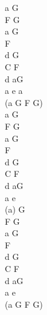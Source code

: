 \documentclass[a5paper, 10pt]{book}
\begin{document}
\begin{minipage}[t]{0.2\textwidth}
  a  G\\
  F  G\\
  a  G\\
  F  \\
  d  G\\
  C  F\\
  d aG\\
  a e a\\
  (a G F G)\\

  a  G\\
  F  G\\
  a  G\\
  F  \\
  d  G\\
  C  F\\
  d aG\\
  a e\\

  (a) G\\
  F  G\\
  a  G\\
  F  \\
  d  G\\
  C  F\\
  d aG\\
  a e\\
  (a G F G)\\

\end{minipage}

\newpage
\end{document}
